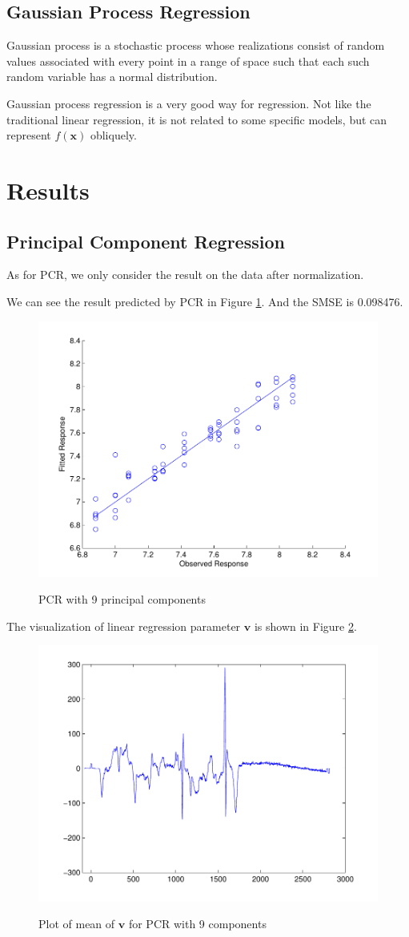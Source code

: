 \documentclass[a4paper]{article}
\newcommand{\bfv}{\mathbf{v}}
\newcommand{\bfx}{\mathbf{x}}
\begin{document}
\subsection{Gaussian Process Regression}
Gaussian process \cite{rasmussen2006gaussian} is a stochastic process whose realizations consist of random values associated with every point in a range of space such that each such random variable has a normal distribution. 

Gaussian process regression is a very good way for regression. Not like the traditional linear regression, it is not related to some specific models, but can represent $f(\bfx)$ obliquely.

\section{Results}
\subsection{Principal Component Regression}
As for PCR, we only consider the result on the data after normalization. 

We can see the result predicted by PCR in Figure \ref{pic4}. And the SMSE is 0.098476.
\begin{figure}[h]
  \centering
  \includegraphics[width=.6\textwidth]{images/predict_PCR.pdf}\\
  \caption{PCR with 9 principal components}\label{pic4}
\end{figure}

The visualization of linear regression parameter $\bfv$ is shown in Figure \ref{pic5}.
\begin{figure}[h]
  \centering
  \includegraphics[width=.6\textwidth]{images/v_PCR.pdf}\\
  \caption{Plot of mean of $\bfv$ for PCR with 9 components}\label{pic5}
\end{figure}
\end{document}
